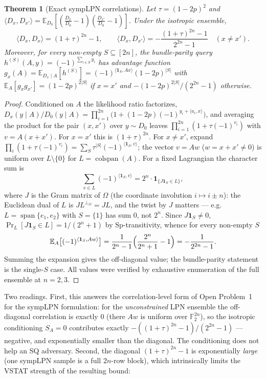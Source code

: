 \documentclass[11pt,a4paper]{article}
\theoremstyle{plain}
\newtheorem{theorem}{Theorem}[section]
\theoremstyle{definition}
\newcommand{\F}{\mathbb{F}}
\newcommand{\E}{\mathbb{E}}
\begin{document}
\begin{theorem}[Exact sympLPN correlations]
\label{thm:symplpn-corr}
Let $\tau = (1-2p)^2$ and $\langle D_x, D_{x'} \rangle = \E_{D_0}[(\tfrac{D_x}{D_0}-1)(\tfrac{D_{x'}}{D_0}-1)]$. Under the isotropic ensemble,
\[
\langle D_x, D_x \rangle = (1+\tau)^{2n} - 1, \qquad
\langle D_x, D_{x'} \rangle = -\frac{(1+\tau)^{2n}-1}{2^{2n}-1} \quad (x \neq x').
\]
Moreover, for every non-empty $S \subseteq [2n]$, the bundle-parity query $h^{(S)}(A,y) = (-1)^{\sum_{i \in S} y_i}$ has advantage function $g_x(A) = \E_{D_x \mid A}[h^{(S)}] = (-1)^{\langle \mathbf 1_S, Ax\rangle}(1-2p)^{|S|}$ with $\E_A[g_x g_{x'}] = (1-2p)^{2|S|}$ if $x = x'$ and $-(1-2p)^{2|S|}/(2^{2n}-1)$ otherwise.
\end{theorem}

\begin{proof}
Conditioned on $A$ the likelihood ratio factorizes, $D_x(y \mid A)/D_0(y \mid A) = \prod_{i=1}^{2n} \bigl(1 + (1-2p)(-1)^{y_i + \langle a_i, x \rangle}\bigr)$, and averaging the product for the pair $(x,x')$ over $y \sim D_0$ leaves $\prod_{i=1}^{2n}(1 + \tau(-1)^{v_i})$ with $v = A(x + x')$. For $x = x'$ this is $(1+\tau)^{2n}$. For $x \neq x'$, expand $\prod_i (1 + \tau (-1)^{v_i}) = \sum_{S} \tau^{|S|} (-1)^{\langle \mathbf 1_S, v \rangle}$; the vector $v = Aw$ ($w = x + x' \neq 0$) is uniform over $L \setminus \{0\}$ for $L = \operatorname{colspan}(A)$. For a fixed Lagrangian the character sum is
\[
\sum_{v \in L} (-1)^{\langle \mathbf 1_S, v \rangle} = 2^n \cdot \mathbf 1_{\{J \mathbf 1_S \in L\}},
\]
where $J$ is the Gram matrix of $\Omega$ (the coordinate involution $i \mapsto i \pm n$): the Euclidean dual of $L$ is $J L^{\perp_\Omega} = JL$, and the twist by $J$ matters --- e.g.\ $L = \operatorname{span}\{e_1, e_2\}$ with $S = \{1\}$ has sum $0$, not $2^n$. Since $J \mathbf 1_S \neq 0$, $\Pr_L[J \mathbf 1_S \in L] = 1/(2^n+1)$ by $\mathrm{Sp}$-transitivity, whence for every non-empty $S$
\[
\E_A\bigl[(-1)^{\langle \mathbf 1_S, Aw \rangle}\bigr] = \frac{1}{2^n - 1}\Bigl(\frac{2^n}{2^n+1} - 1\Bigr) = -\frac{1}{2^{2n}-1}.
\]
Summing the expansion gives the off-diagonal value; the bundle-parity statement is the single-$S$ case. All values were verified by exhaustive enumeration of the full ensemble at $n = 2, 3$.
\end{proof}

Two readings. First, this answers the correlation-level form of Open Problem~1 for the sympLPN formulation: for the \emph{unconstrained} LPN ensemble the off-diagonal correlation is exactly $0$ (there $Aw$ is uniform over $\F_2^{2n}$), so the isotropic conditioning $S_A = 0$ contributes exactly $-((1+\tau)^{2n}-1)/(2^{2n}-1)$ --- negative, and exponentially smaller than the diagonal. The conditioning does not help an SQ adversary. Second, the diagonal $(1+\tau)^{2n}-1$ is exponentially \emph{large} (one sympLPN sample is a full $2n$-row block), which intrinsically limits the VSTAT strength of the resulting bound:
\end{document}
